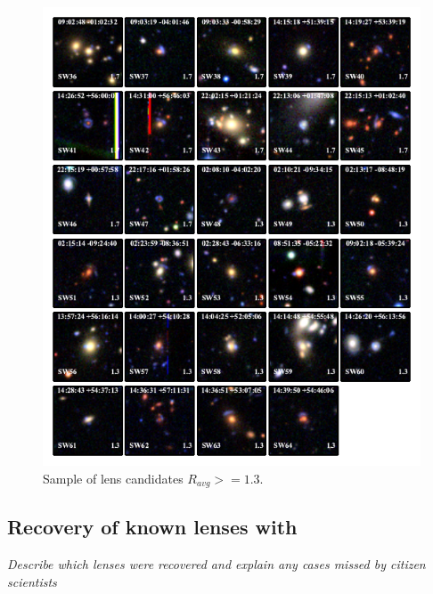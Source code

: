 \documentclass[useAMS,usenatbib,a4paper]{mn2e}
\begin{document}
\begin{figure}
\begin{center}
\includegraphics[scale=1.5]{sw-cfhtls-figs/lenscandfin_1.pdf}
\caption{ \label{fig:lcl}
Sample of lens candidates $R_{avg}>=1.3$.
}
\end{center}
\end{figure}



\subsection{Recovery of known \cfhtls lenses with \sw}
\label{sec:results:known}

{\it Describe which lenses were recovered and explain any cases missed by
citizen scientists}
\end{document}
